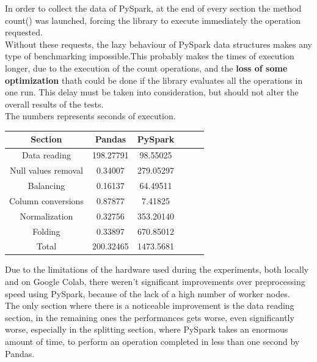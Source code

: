 \documentclass[
	letterpaper, %
	10pt, %
]{class}
\begin{document}
In order to collect the data of PySpark, at the end of every section the method count() was launched, forcing the library to execute immediately the operation requested.\\

Without these requests, the lazy behaviour of PySpark data structures makes any type of benchmarking impossible.This probably makes the times of execution longer, due to
the execution of the count operations, and the \textbf{loss of some optimization} thath could be done if the library evaluates all the operations in one run.
This delay must be taken into consideration, but should not alter the overall results of the tests.\\

The numbers represents seconds of execution.

\begin{center}
    \begin{tabular}{ |c|c|c|c|c|c| }
        \hline
        Section             & Pandas    & PySpark   \\
        \hline
        Data reading        & 198.27791 & 98.55025  \\
        Null values removal & 0.34007   & 279.05297 \\
        Balancing           & 0.16137   & 64.49511  \\
        Column conversions  & 0.87877   & 7.41825   \\
        Normalization       & 0.32756   & 353.20140 \\
        Folding             & 0.33897   & 670.85012 \\
        Total               & 200.32465 & 1473.5681 \\
        \hline
    \end{tabular}
\end{center}


Due to the limitations of the hardware used during the experiments, both locally and on Google Colab, there weren't significant improvements over preprocessing speed using PySpark, because of the lack of a high number of worker nodes.\\

The only section where there is a noticeable improvement is the data reading section, in the remaining ones the performances gets worse, even significantly worse, especially in the splitting section, where PySpark takes an enormous amount of time, to perform
an operation completed in less than one second by Pandas.\\
\end{document}
